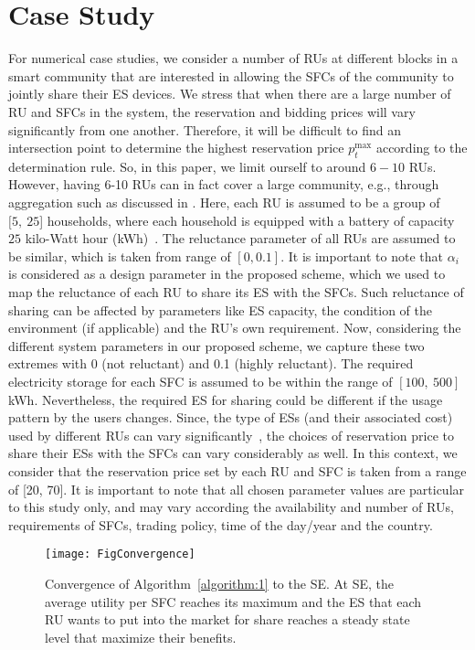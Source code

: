 \documentclass[journal,10pt]{IEEEtran}
\begin{document}
\section{Case Study}\label{sec:case-study}
For numerical case studies, we consider a number of RUs at different blocks in a smart community that are interested in allowing the SFCs of the community to jointly share their ES devices. We stress that when there are a large number of RU and SFCs in the system, the reservation and bidding prices will vary significantly from one another. Therefore, it will be difficult to find an intersection point to determine the highest reservation price $p_t^\text{max}$ according to the determination rule. So, in this paper, we limit ourself to around $6-10$ RUs. However, having 6-10 RUs can in fact cover a large community, e.g., through aggregation such as discussed in \cite{Gkatzikis:2013,Wayes-J-TSG:2012}. Here, each RU is assumed to be a group of $[5,~25$] households, where each household is equipped with a battery of capacity $25$ kilo-Watt hour (kWh)~\cite{battery:2013}. The reluctance parameter of all RUs are assumed to be similar, which is taken from range of $[0, 0.1]$. It is important to note that $\alpha_i$ is considered as a design parameter in the proposed scheme, which we used to map the reluctance of each RU to share its ES with the SFCs. Such reluctance of sharing can be affected by parameters like ES capacity, the condition of the environment (if applicable) and the RU's own requirement. Now, considering the different system parameters in our proposed scheme, we capture these two extremes with 0 (not reluctant) and 0.1 (highly reluctant). The required electricity storage for each SFC is assumed to be within the range of $[100,~500]$ kWh. Nevertheless, the required ES for sharing could be different if the usage pattern by the users changes. Since, the type of ESs (and their associated cost) used by different RUs can vary significantly~\cite{storageType:2012}, the choices of reservation price to share their ESs with the SFCs can vary considerably as well. In this context, we consider that the reservation price  set by each RU and SFC is taken from a range of [20, 70]. It is important to note that all chosen parameter values are particular to this study only, and may vary according the availability and number of RUs, requirements of SFCs, trading policy, time of the day/year and the country.

\begin{figure}[t!]
\centering
\texttt{[image: FigConvergence]}
\caption{Convergence of Algorithm~\ref{algorithm:1} to the SE. At SE, the average utility per SFC reaches its maximum and the ES that each RU wants to put into the market for share reaches a steady state level that maximize their benefits.} \label{fig:Convergence}
\end{figure}
\end{document}

